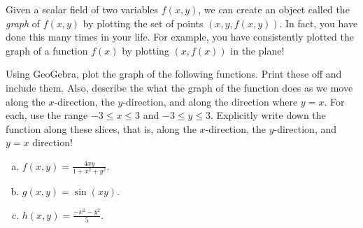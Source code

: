 \documentclass[12pt]{article} %
\begin{document}
\newpage
\begin{problem}
Given a scalar field of two variables $f(x,y)$, we can create an object called the \emph{graph} of $f(x,y)$ by plotting the set of points $(x,y,f(x,y))$. In fact, you have done this many times in your life. For example, you have consistently plotted the graph of a function $f(x)$ by plotting $(x,f(x))$ in the plane!

Using GeoGebra, plot the graph of the following functions. Print these off and include them.  Also, describe the what the graph of the function does as we move along the $x$-direction, the $y$-direction, and along the direction where $y=x$. For each, use the range $-3\leq x \leq 3$ and $-3\leq y \leq 3$. Explicitly write down the function along these slices, that is, along the $x$-direction, the $y$-direction, and $y=x$ direction!
\begin{enumerate}[(a)]
	\item $f(x,y) = \frac{4xy}{1+x^2+y^2}$.
	\item $g(x,y) = \sin(xy)$.
	\item $h(x,y) = \frac{-x^2-y^2}{5}$.
\end{enumerate}
\end{problem}
\end{document}
